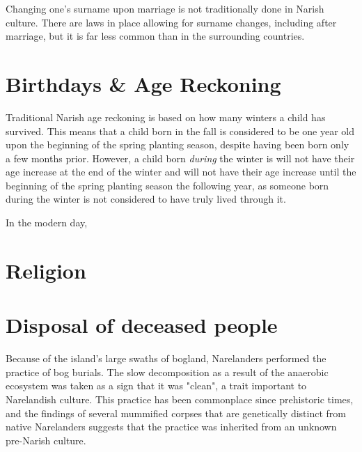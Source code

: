 \documentclass[a4paper,11pt,twoside,openright]{memoir}
\begin{document}
Changing one's surname upon marriage is not traditionally done in Narish culture. There are laws in place allowing for surname changes, including after marriage, but it is far less common than in the surrounding countries. 

\chapter{Birthdays \& Age Reckoning}

Traditional Narish age reckoning is based on how many winters a child has survived. This means that a child born in the fall is considered to be one year old upon the beginning of the spring planting season, despite having been born only a few months prior. However, a child born \emph{during} the winter is will not have their age increase at the end of the winter and will not have their age increase until the beginning of the spring planting season the following year, as someone born during the winter is not considered to have truly lived through it.

In the modern day, 

\chapter{Religion}

\chapter{Disposal of deceased people}

Because of the island's large swaths of bogland, Narelanders performed the practice of bog burials. The slow decomposition as a result of the anaerobic ecosystem was taken as a sign that it was "clean", a trait important to Narelandish culture. This practice has been commonplace since prehistoric times, and the findings of several mummified corpses that are genetically distinct from native Narelanders suggests that the practice was inherited from an unknown pre-Narish culture.
\end{document}
